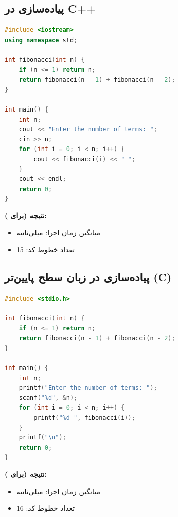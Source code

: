 \documentclass[12pt, a4paper]{report}
\begin{document}
\subsection{پیاده‌سازی در C++}

\begin{LTR}
	\begin{lstlisting}[language=C++, breaklines=true]
#include <iostream>
using namespace std;

int fibonacci(int n) {
	if (n <= 1) return n;
	return fibonacci(n - 1) + fibonacci(n - 2);
}

int main() {
	int n;
	cout << "Enter the number of terms: ";
	cin >> n;
	for (int i = 0; i < n; i++) {
		cout << fibonacci(i) << " ";
	}
	cout << endl;
	return 0;
}

	\end{lstlisting}
\end{LTR}

\textbf{نتیجه (برای ):}
\begin{itemize}
	\item میانگین زمان اجرا: \textnormal{} میلی‌ثانیه
	\item تعداد خطوط کد: \textnormal{15}
\end{itemize}


\subsection{پیاده‌سازی در زبان سطح پایین‌تر (C)}

\begin{LTR}
	\begin{lstlisting}[language=C, breaklines=true]
#include <stdio.h>

int fibonacci(int n) {
	if (n <= 1) return n;
	return fibonacci(n - 1) + fibonacci(n - 2);
}

int main() {
	int n;
	printf("Enter the number of terms: ");
	scanf("%d", &n);
	for (int i = 0; i < n; i++) {
		printf("%d ", fibonacci(i));
	}
	printf("\n");
	return 0;
}

	\end{lstlisting}
\end{LTR}

\textbf{نتیجه (برای ):}
\begin{itemize}
	\item میانگین زمان اجرا: \textnormal{} میلی‌ثانیه
	\item تعداد خطوط کد: \textnormal{16}
\end{itemize}
\end{document}
